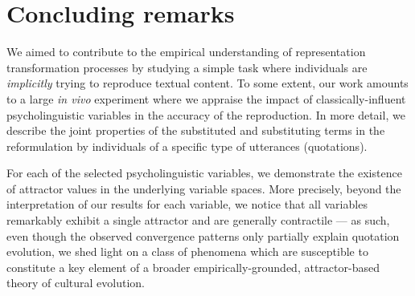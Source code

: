 \section{Concluding remarks}\label{sec:conclusion}



We aimed to contribute to the empirical understanding of representation transformation processes %
 by studying a simple task where individuals are \emph{implicitly} trying to reproduce textual content. To some extent, our work amounts to a large \emph{in vivo} experiment where we appraise the impact of classically-influent psycholinguistic variables in the accuracy of the reproduction.
In more detail, we describe the joint properties of the substituted and substituting terms in the reformulation by individuals of a specific type of utterances (quotations). %


For each of the selected psycholinguistic variables, we demonstrate the existence of attractor values in the underlying variable spaces. More precisely, beyond the interpretation of our results for each variable, we notice that all variables remarkably exhibit a single attractor and are generally contractile --- as such, even though the observed convergence patterns only partially explain quotation evolution, we shed light on a class of phenomena which are susceptible to constitute a key element of a broader empirically-grounded, attractor-based theory of cultural evolution.





